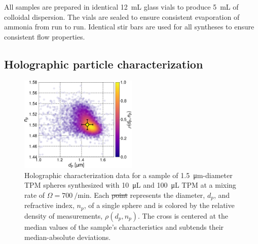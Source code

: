\documentclass[journal=langd5,manuscript=article]{achemso}
\providecommand{\DIFadd}[1]{{\protect\color{blue}\uwave{#1}}} %
\providecommand{\DIFdel}[1]{{\protect\color{red}\sout{#1}}}                      %
\providecommand{\DIFaddFL}[1]{\DIFadd{#1}} %
\providecommand{\DIFdelFL}[1]{\DIFdel{#1}} %
\providecommand{\DIFaddbeginFL}{} %
\providecommand{\DIFaddendFL}{} %
\providecommand{\DIFdelbeginFL}{} %
\providecommand{\DIFdelendFL}{} %
\begin{document}
All samples are prepared in identical \SI{12}{\milli\liter}
glass vials to produce \SI{5}{\milli\liter} of colloidal dispersion.
The vials are sealed to ensure consistent evaporation of ammonia
from run to run.
Identical stir bars are used for all syntheses to ensure consistent flow properties.

\subsection{Holographic particle characterization}
\label{sec:holographicparticlecharacterization}

\begin{figure}[!b]
    \centering
    \includegraphics[width=0.5\textwidth]{distribution03}
    \caption{Holographic characterization data for a sample
    of \SI{1.5}{\um}-diameter TPM spheres synthesized with
    \SI{10}{\micro\liter}  and 
    \SI{100}{\micro\liter} TPM at a mixing rate
    of $\Omega = \SI{700}{\per\minute}$.  Each 
    \DIFdelbeginFL \DIFdelFL{point
    }\DIFdelendFL \DIFaddbeginFL \DIFaddFL{of the \num{6935} points
    }\DIFaddendFL represents the diameter, $d_p$, and refractive index,
    $n_p$, of a single sphere and is colored by the relative
    density of measurements, $\rho(d_p, n_p)$.
    The cross is centered at the median values of the sample's
    characteristics and subtends their 
    median-absolute deviations.}
    \label{fig:typicalcharacterization}
\end{figure}
\end{document}
